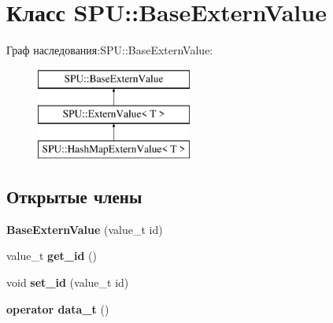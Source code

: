 \hypertarget{class_s_p_u_1_1_base_extern_value}{}\section{Класс S\+PU\+:\+:Base\+Extern\+Value}
\label{class_s_p_u_1_1_base_extern_value}
Граф наследования\+:S\+PU\+:\+:Base\+Extern\+Value\+:\begin{figure}[H]
\begin{center}
\leavevmode
\includegraphics[height=3.000000cm]{class_s_p_u_1_1_base_extern_value}
\end{center}
\end{figure}
\subsection*{Открытые члены}
\begin{DoxyCompactItemize}
\item 
\mbox{\label{class_s_p_u_1_1_base_extern_value_ae9e51d018d0d35d805c8fdbd192ac5c7}} 
{\bfseries Base\+Extern\+Value} (value\+\_\+t id)
\item 
\mbox{\label{class_s_p_u_1_1_base_extern_value_a9a43c99d29c04561ea539d12bae72d16}} 
value\+\_\+t {\bfseries get\+\_\+id} ()
\item 
\mbox{\label{class_s_p_u_1_1_base_extern_value_a568e32ba8cc9977e5ad6545838b599dc}} 
void {\bfseries set\+\_\+id} (value\+\_\+t id)
\item 
\mbox{\label{class_s_p_u_1_1_base_extern_value_aa281e19470299ce9d622392d7d4fb9f2}} 
{\bfseries operator data\+\_\+t} ()
\end{DoxyCompactItemize}
